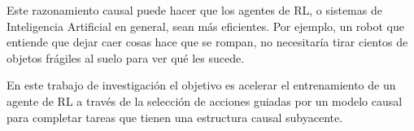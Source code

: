         
    






Este razonamiento causal puede hacer 
que los agentes de RL, o sistemas de Inteligencia Artificial en general, 
sean más eficientes.
Por ejemplo, un robot que entiende que dejar caer cosas hace que se rompan, no necesitaría tirar cientos de objetos frágiles al suelo para ver qué les sucede.





En este trabajo de investigación el objetivo es 
acelerar el entrenamiento de un agente de RL
a través de la selección de acciones guiadas por un 
modelo causal para completar tareas que tienen una
estructura causal subyacente.

